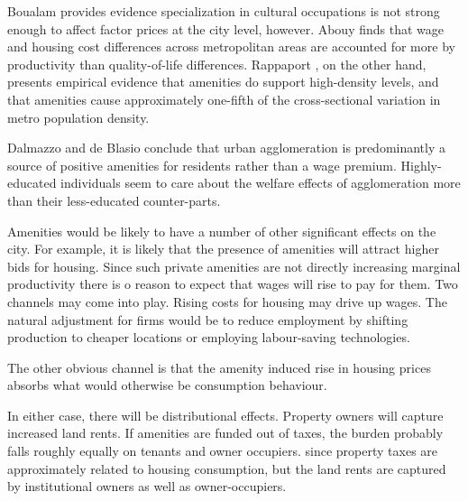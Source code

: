   Boualam \cite{boualamDoesCultureAffect2014} provides evidence specialization in cultural occupations is not strong enough to affect factor prices at the city level, however. Abouy \cite{albouyWhatAreCities2016} finds that wage and housing cost differences across metropolitan areas are accounted for more by productivity than quality-of-life differences. Rappaport \cite{rappaportConsumptionAmenitiesCity2008}, on the other hand, presents empirical evidence  that amenities do support high-density levels, and that amenities  cause approximately one-fifth of the cross-sectional variation in metro population density. 

  Dalmazzo and  de Blasio\cite{dalmazzoAmenitiesSkillbiasedAgglomeration2011} conclude that urban agglomeration is predominantly a source of positive amenities for residents rather than a wage premium. Highly-educated individuals seem to care about the welfare effects of agglomeration more than their less-educated counter-parts. 


Amenities would be likely to have a number of other significant effects on the city. For example, it is likely that the presence of amenities will attract higher bids for housing. Since such private amenities are not directly increasing marginal productivity there is o reason to expect that wages will rise to pay for them. Two channels may come into play. Rising costs for housing may drive up wages. The natural adjustment for firms would be to reduce employment by shifting production to cheaper locations or  employing labour-saving technologies.

The other obvious channel is that the amenity induced rise in housing prices absorbs what would otherwise be consumption behaviour.

In either case, there will be distributional effects. Property owners will capture increased land rents. If amenities are funded out of taxes, the burden probably falls roughly equally on tenants and owner occupiers. since property taxes are approximately related to housing consumption, but the land rents are captured by institutional owners as well as owner-occupiers.

